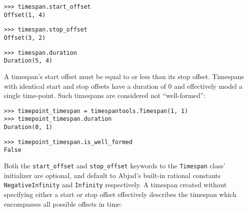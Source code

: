 \begin{comment}
<abjad>
timespan.start_offset
timespan.stop_offset
timespan.duration
</abjad>
\end{comment}

\begin{singlespacing}
\vspace{-0.5\baselineskip}
\begin{lstlisting}
>>> timespan.start_offset
Offset(1, 4)
\end{lstlisting}
\begin{lstlisting}
>>> timespan.stop_offset
Offset(3, 2)
\end{lstlisting}
\begin{lstlisting}
>>> timespan.duration
Duration(5, 4)
\end{lstlisting}
\end{singlespacing}

\noindent A timespan's start offset must be equal to or less than its stop
offset. Timespans with identical start and stop offsets have a duration of 0
and effectively model a single time-point. Such timespans are considered not
\enquote{well-formed}:

\begin{comment}
<abjad>
timepoint_timespan = timespantools.Timespan(1, 1)
timepoint_timespan.duration
timepoint_timespan.is_well_formed
</abjad>
\end{comment}

\begin{singlespacing}
\vspace{-0.5\baselineskip}
\begin{lstlisting}
>>> timepoint_timespan = timespantools.Timespan(1, 1)
>>> timepoint_timespan.duration
Duration(0, 1)
\end{lstlisting}
\begin{lstlisting}
>>> timepoint_timespan.is_well_formed
False
\end{lstlisting}
\end{singlespacing}

\noindent Both the \texttt{start\_offset} and \texttt{stop\_offset} keywords to
the \texttt{Timespan} class' initializer are optional, and default to Abjad's
built-in rational constants \texttt{NegativeInfinity} and \texttt{Infinity}
respectively. A timespan created without specifying either a start or stop
offset effectively describes the timespan which encompasses all possible
offsets in time:

